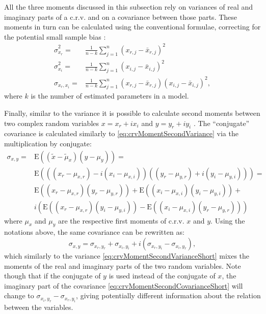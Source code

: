 \documentclass[
]{book}
\begin{document}
All the three moments discussed in this subsection rely on variances of real and imaginary parts of a c.r.v. and on a covariance between those parts. These moments in turn can be calculated using the conventional formulae, correcting for the potential small sample bias \citep{referenceSBA}:
\begin{equation}
    \begin{aligned}
        \hat{\sigma}_{x_r}^2 = & \frac{1}{n-k} \sum_{j=1}^n (x_{r,j}-\bar{x}_{r,j})^2 \\
        \hat{\sigma}_{x_i}^2 = & \frac{1}{n-k} \sum_{j=1}^n (x_{i,j}-\bar{x}_{i,j})^2 \\
        \hat{\sigma}_{x_r, x_i} = & \frac{1}{n-k} \sum_{j=1}^n (x_{r,j}-\bar{x}_{r,j})(x_{i,j}-\bar{x}_{i,j})^2 ,
    \end{aligned}
    \label{eq:crvMomentSecondSample}
\end{equation}
where \(k\) is the number of estimated parameters in a model.

Finally, similar to the variance it is possible to calculate second moments between two complex random variables \(x = x_r+i x_i\) and \(y = y_r + i y_i\) \citep{Picinbono}. The ``conjugate'' covariance is calculated similarly to \eqref{eq:crvMomentSecondVariance} via the multiplication by conjugate:
\begin{equation}
    \begin{aligned}
    \sigma_{x,y} = & \mathrm{E}((\tilde{x}-\tilde{\mu}_x) (y-\mu_y)) = \\
                   & \mathrm{E}\left(((x_r-\mu_{x,r}) - i (x_i-\mu_{x,i}))((y_r-\mu_{y,r}) + i (y_i-\mu_{y,i}))\right) = \\
                   & \mathrm{E}((x_r-\mu_{x,r})(y_r-\mu_{y,r})) + \mathrm{E}((x_i-\mu_{x,i})(y_i-\mu_{y,i})) + \\
                   & i \left(\mathrm{E}((x_r-\mu_{x,r})(y_i-\mu_{y,i})) - \mathrm{E}((x_i-\mu_{x,i})(y_r-\mu_{y,r}))\right)
    \end{aligned}
    \label{eq:crvMomentSecondCovariance}
\end{equation}
where \(\mu_{x}\) and \(\mu_y\) are the respective first moments of c.r.v. \(x\) and \(y\). Using the notations above, the same covariance can be rewritten as:
\begin{equation}
    \sigma_{x,y} = \sigma_{x_r, y_r} + \sigma_{x_i, y_i} + i (\sigma_{x_r, y_i} - \sigma_{x_i, y_r}),
    \label{eq:crvMomentSecondCovarianceShort}
\end{equation}
which similarly to the variance \eqref{eq:crvMomentSecondVarianceShort} mixes the moments of the real and imaginary parts of the two random variables. Note though that if the conjugate of \(y\) is used instead of the conjugate of \(x\), the imaginary part of the covariance \eqref{eq:crvMomentSecondCovarianceShort} will change to \(\sigma_{x_i, y_r} - \sigma_{x_r, y_i}\), giving potentially different information about the relation between the variables.
\end{document}
